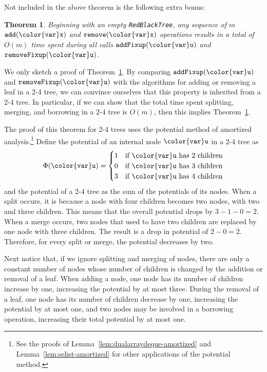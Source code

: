 \documentclass[10pt]{book}
\theoremstyle{plain}
\newtheorem{thm}{Theorem}[chapter]
\newcommand{\thmlabel}[1]{\label{thm:#1}}
\newcommand{\thmref}[1]{Theorem~\ref{thm:#1}}
\newcommand{\lemref}[1]{Lemma~\ref{lem:#1}}
\theoremstyle{definition}
\begin{document}
Not included in the above theorem is the following extra bonus:

\begin{thm}\thmlabel{redblack-amortized}
  Beginning with an empty \texttt{RedBlackTree}, any sequence of $m$
  \ensuremath{\mathtt{add({\color{var}x})}} and \ensuremath{\mathtt{remove({\color{var}x})}} operations results in a total of $O(m)$
  time spent during all calls \ensuremath{\mathtt{addFixup({\color{var}u})}} and \ensuremath{\mathtt{removeFixup({\color{var}u})}}. 
\end{thm}

We only sketch a proof of \thmref{redblack-amortized}. By comparing
\ensuremath{\mathtt{addFixup({\color{var}u})}} and \ensuremath{\mathtt{removeFixup({\color{var}u})}} with the algorithms for adding or
removing a leaf in a 2-4 tree, we can convince ourselves that this
property is inherited from a 2-4 tree.  In particular, if we can show
that the total time spent splitting, merging, and borrowing in a 2-4
tree is $O(m)$, then this implies \thmref{redblack-amortized}.

The proof of this theorem for 2-4 trees uses the potential
method
%
of amortized analysis.\footnote{See the proofs of
\lemref{dualarraydeque-amortized} and \lemref{selist-amortized} for
other applications of the potential method.} Define the potential of an
internal node \ensuremath{\mathtt{{\color{var}u}}} in a 2-4 tree as
\[
  \Phi(\ensuremath{\mathtt{{\color{var}u}}}) = 
    \begin{cases} 
      1 & \text{if \ensuremath{\mathtt{{\color{var}u}}} has 2 children} \\ 
      0 & \text{if \ensuremath{\mathtt{{\color{var}u}}} has 3 children} \\ 
      3 & \text{if \ensuremath{\mathtt{{\color{var}u}}} has 4 children}  
    \end{cases}
\]
and the potential of a 2-4 tree as the sum of the potentials of its nodes.
When a split occurs, it is because a node with four children becomes
two nodes, with two and three children.  This means that the overall
potential drops by $3-1-0 = 2$. When a merge occurs, two nodes that used
to have two children are replaced by one node with three children. The
result is a drop in potential of $2-0=2$.  Therefore, for every split
or merge, the potential decreases by two.

Next notice that, if we ignore splitting and merging of nodes, there are
only a constant number of nodes whose number of children is changed by
the addition or removal of a leaf.  When adding a node, one node has
its number of children increase by one, increasing the potential by
at most three.  During the removal of a leaf, one node has its number
of children decrease by one, increasing the potential by at most one,
and two nodes may be involved in a borrowing operation, increasing their
total potential by at most one.
\end{document}
